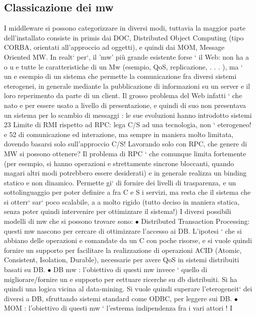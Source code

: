 \documentclass[a4paper,12pt]{article}
\begin{document}
\subsection{Classicazione dei mw}
I middleware si possono categorizzare in diversi modi, tuttavia la maggior parte
dell'installato consiste in primis dai DOC, Distributed Object Computing (tipo
CORBA, orientati all'approccio ad oggetti), e quindi dai MOM, Message Oriented MW. In realt` per`, il 'mw' più grande
esistente forse ` il Web: non ha
a
o
u
e
tutte le caratteristiche di un Mw (esempio, QoS, replicazione, . . . ), ma ` un
e
esempio di un sistema che permette la comunicazione fra diversi sistemi eterogenei, in generale mediante la
pubblicazione di informazioni su un server e il loro
reperimento da parte di un client. Il grosso problema del Web infatti ` che nato
e
per essere usato a livello di presentazione, e quindi di suo non presentava un
sistema per lo scambio di messaggi : le sue evoluzioni hanno introdotto sistemi
23 Limite
di RMI rispetto ad RPC: lega C/S ad una tecnologia, non ` eterogeneo!
e
52
di comunicazione ed interazione, ma sempre in maniera molto limitata, dovendo
basarsi solo sull'approccio C/S!
Lavorando solo con RPC, che genere di MW si possono ottenere? Il problema
di RPC ` che comunque limita fortemente (per esempio, si hanno operazioni
e
strettamente sincrone bloccanti, quando magari altri modi potrebbero essere
desiderati) e in generale realizza un binding statico e non dinamico. Permette
gi` di fornire dei livelli di trasparenza, e un sottolinguaggio per poter definire
a
fra C e S i servizi, ma resta che il sistema che si otterr` sar` poco scalabile,
a
a
molto rigido (tutto deciso in maniera statica, senza poter quindi intervenire per
ottimizzare il sistema!)
I diversi possibili modelli di mw che si possono trovare sono:
$\bullet$ Distributed Transaction Processing: questi mw nascono per cercare di
ottimizzare l'accesso ai DB. L'ipotesi ` che si abbiano delle operazioni
e
comandate da un C con poche risorse, e si vuole quindi fornire un supporto
per facilitare la realizzazione di operazioni ACID (Atomic, Consistent,
Isolation, Durable), necessarie per avere QoS in sistemi distribuiti basati
su DB.
$\bullet$ DB mw : l'obiettivo di questi mw invece ` quello di migliorare/fornire un
e
supporto per eettuare ricerche su db distribuiti. Si ha quindi una logica
vicina al data-mining. Si vuole quindi superare l'eterogeneit` dei diversi
a
DB, sfruttando sistemi standard come ODBC, per leggere sui DB.
$\bullet$ MOM : l'obiettivo di questi mw ` l'estrema indipendenza fra i vari attori ! I
\end{document}
